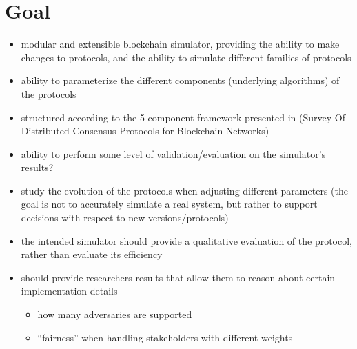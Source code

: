 \section{Goal}

\begin{itemize}
  \item modular and extensible blockchain simulator, providing the ability to make changes to protocols, and the ability to simulate different families of protocols
  \item ability to parameterize the different components (underlying algorithms) of the protocols
  \item structured according to the 5-component framework presented in (Survey Of Distributed Consensus Protocols for Blockchain Networks)
  \item ability to perform some level of validation/evaluation on the simulator’s results?
  \item study the evolution of the protocols when adjusting different parameters (the goal is not to accurately simulate a real system, but rather to support decisions with respect to new versions/protocols)
  \item the intended simulator should provide a qualitative evaluation of the protocol, rather than evaluate its efficiency
  \item should provide researchers results that allow them to reason about certain implementation details
  \begin{itemize}
    \item how many adversaries are supported
    \item “fairness” when handling stakeholders with different weights
  \end{itemize}
\end{itemize}
